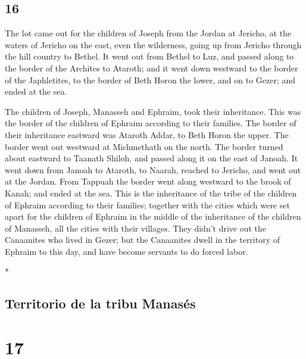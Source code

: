 \begin{paracol}{2}
\switchcolumn
\begin{otherlanguage}{english}

\hypertarget{section-31}{%
\section{16}\label{section-31}}

 The lot came out for the children of Joseph from the
Jordan at Jericho, at the waters of Jericho on the east, even the
wilderness, going up from Jericho through the hill country to Bethel.
 It went out from Bethel to Luz, and passed along to the
border of the Archites to Ataroth;  and it went down
westward to the border of the Japhletites, to the border of Beth Horon
the lower, and on to Gezer; and ended at the sea.

 The children of Joseph, Manasseh and Ephraim, took their
inheritance.  This was the border of the children of
Ephraim according to their families. The border of their inheritance
eastward was Ataroth Addar, to Beth Horon the upper.  The
border went out westward at Michmethath on the north. The border turned
about eastward to Taanath Shiloh, and passed along it on the east of
Janoah.  It went down from Janoah to Ataroth, to Naarah,
reached to Jericho, and went out at the Jordan.  From
Tappuah the border went along westward to the brook of Kanah; and ended
at the sea. This is the inheritance of the tribe of the children of
Ephraim according to their families;  together with the
cities which were set apart for the children of Ephraim in the middle of
the inheritance of the children of Manasseh, all the cities with their
villages.  They didn't drive out the Canaanites who lived
in Gezer; but the Canaanites dwell in the territory of Ephraim to this
day, and have become servants to do forced labor.

\end{otherlanguage}

\switchcolumn[0]*

\hypertarget{territorio-de-la-tribu-manasuxe9s}{%
\subsection{Territorio de la tribu
Manasés}\label{territorio-de-la-tribu-manasuxe9s}}

\hypertarget{section-32}{%
\section{17}\label{section-32}}


\end{paracol}
